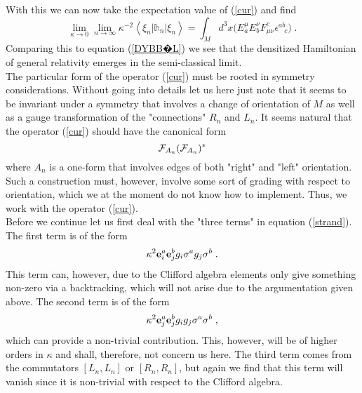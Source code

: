 \documentclass[12pt]{article}
\def\e{\epsilon}
\def\m{\mu}
\def\n{\nu}
\def\cf{{\cal F}}
\begin{document}
With this we can now
 take the expectation value of (\ref{cur}) and find
\begin{equation}
\lim_{\kappa\rightarrow 0}\lim_{n\rightarrow\infty} \kappa^{-2}  \left\langle \xi_n \vert   \mathds{h}_n  \vert \xi_n \right\rangle = \int_M d^3x  \Big( E_a^\m E^\n_b F_{\m\n}^c \e^{ab}_{\;\;\;c}\Big)\;.
\label{dynamics}
\end{equation}
Comparing this to equation (\ref{DYBB�L}) we see that the densitized Hamiltonian of general relativity emerges in the semi-classical limit. \\

The particular form of the operator (\ref{cur}) must be rooted in symmetry considerations. Without going into details let us here just note that it seems to be invariant under a symmetry that involves a change of orientation of $M$ as well as a gauge transformation of the "connections" $R_n$ and $L_n$.  It seems natural that the operator (\ref{cur}) should have the canonical form
$$
 \cf_{A_n} (\cf_{A_n})^* 
$$
where $A_n$ is a one-form that involves edges of both "right" and "left" orientation. Such a construction must, however, involve some sort of grading with respect to orientation, which we at the moment do not know how to implement. Thus, we work with the operator (\ref{cur}).
\\



Before we continue let us first deal with the "three terms" in equation (\ref{strand}). The first term is of the form
$$
\kappa^2 {\bf e}^a_i {\bf e}^b_j g_i \sigma^a g_j \sigma^b\;.
$$
This term can, however, due to the Clifford algebra elements only give something non-zero via a backtracking, which will not arise due to the argumentation given above. The second term is of the form
$$
\kappa^2 {\bf e}^a_j {\bf e}^b_j g_i g_j  \sigma^a\sigma^b\;,
$$
which can provide a non-trivial contribution. This, however, will be of higher orders in $\kappa$ and shall, therefore, not concern us here. The third term comes from the commutators $[L_n,L_n]$ or $[R_n,R_n]$, but again we find that this term will vanish since it is non-trivial with respect to the Clifford algebra.\\

\end{document}
